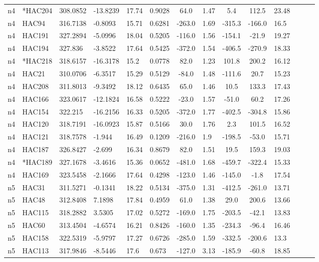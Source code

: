 \documentclass[useAMS,usenatbib]{mn2e}
\begin{document}
\begin{table*}
\begin{minipage}{150mm}
\begin{tabular}{@{}llllllclccllll@{}}
n4 & *HAC204 & 308.0852 & -13.8239 & 17.74 & 0.9028 & 64.0 & 1.47 & 5.4 & 112.5 & 23.48 \\
n4 & HAC94 & 316.7138 & -0.8093 & 15.71 & 0.6281 & -263.0 & 1.69 & -315.3 & -166.0 & 16.5 \\
n4 & HAC191 & 327.2894 & -5.0996 & 18.04 & 0.5205 & -116.0 & 1.56 & -154.1 & -21.9 & 19.27 \\
n4 & HAC194 & 327.836 & -3.8522 & 17.64 & 0.5425 & -372.0 & 1.54 & -406.5 & -270.9 & 18.33 \\
n4 & *HAC218 & 318.6157 & -16.3178 & 15.2 & 0.0778 & 82.0 & 1.23 & 101.8 & 200.2 & 16.12 \\
n4 & HAC21 & 310.0706 & -6.3517 & 15.29 & 0.5129 & -84.0 & 1.48 & -111.6 & 20.7 & 15.23 \\
n4 & HAC208 & 311.8013 & -9.3492 & 18.12 & 0.6435 & 65.0 & 1.46 & 10.5 & 133.3 & 17.43 \\
n4 & HAC166 & 323.0617 & -12.1824 & 16.58 & 0.5222 & -23.0 & 1.57 & -51.0 & 60.2 & 17.26 \\
n4 & HAC154 & 322.215 & -16.2156 & 16.33 & 0.5205 & -372.0 & 1.77 & -402.5 & -304.8 & 15.86 \\
n4 & HAC120 & 318.7191 & -16.0923 & 15.87 & 0.5166 & 30.0 & 1.76 & 2.3 & 101.5 & 16.52 \\
n4 & HAC121 & 318.7578 & -1.944 & 16.49 & 0.1209 & -216.0 & 1.9 & -198.5 & -53.0 & 15.71 \\
n4 & HAC187 & 326.8427 & -2.699 & 16.34 & 0.8679 & 82.0 & 1.51 & 19.5 & 159.3 & 19.03 \\
n4 & *HAC189 & 327.1678 & -3.4616 & 15.36 & 0.0652 & -481.0 & 1.68 & -459.7 & -322.4 & 15.33 \\
n4 & HAC169 & 323.5458 & -2.1666 & 17.64 & 0.4298 & -123.0 & 1.46 & -145.0 & -1.8 & 17.54 \\
n5 & HAC31 & 311.5271 & -0.1341 & 18.22 & 0.5134 & -375.0 & 1.31 & -412.5 & -261.0 & 13.71 \\
n5 & HAC48 & 312.8408 & 7.1898 & 17.84 & 0.4959 & 61.0 & 1.38 & 29.0 & 200.6 & 13.66 \\
n5 & HAC115 & 318.2882 & 3.5305 & 17.02 & 0.5272 & -169.0 & 1.75 & -203.5 & -42.1 & 13.83 \\
n5 & HAC60 & 313.4504 & -4.6574 & 16.21 & 0.8426 & -160.0 & 1.35 & -234.3 & -96.4 & 16.46 \\
n5 & HAC158 & 322.5319 & -5.9797 & 17.27 & 0.6726 & -285.0 & 1.59 & -332.5 & -200.6 & 13.3 \\
n5 & HAC113 & 317.9846 & -8.5446 & 17.6 & 0.673 & -127.0 & 3.13 & -185.9 & -60.8 & 18.85 \\

\end{tabular}
\end{minipage}
\end{table*}
\end{document}

